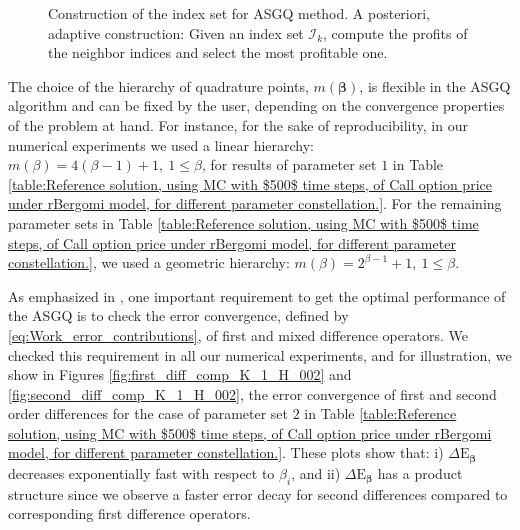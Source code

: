 \begin{figure}[htb]
\begin{subfigure}{0.165\textwidth}
 		\caption{}
 		\label{fig:6}
 	\end{subfigure}
 	\caption{Construction of the index set for ASGQ method. A posteriori, adaptive construction: Given an index set $\mathcal{I}_k$, compute the profits of the neighbor indices and select the most profitable one.}
 	\label{fig:Construction of the index set for ASGQ method}
 \end{figure}
\FloatBarrier

\begin{remark}
	The choice of the hierarchy of quadrature points, $m(\boldsymbol{\beta})$, is flexible in the ASGQ algorithm and can be fixed by the user, depending on the convergence properties of the problem at hand. For instance, for the sake of reproducibility, in our numerical experiments we used a linear hierarchy: $m(\beta)=4 (\beta-1)+1,\: 1 \le \beta $, for results of parameter set $1$ in Table \ref{table:Reference solution, using MC with $500$ time steps, of Call option price under rBergomi model, for different parameter constellation.}. For the remaining parameter sets in Table  \ref{table:Reference solution, using MC with $500$ time steps, of Call option price under rBergomi model, for different parameter constellation.}, we used a geometric hierarchy: $m(\beta)=2^{\beta-1}+1, \:1 \le \beta $.
\end{remark} 
\begin{remark}
As emphasized in \cite{haji2016multi}, one important requirement to get the optimal performance of the ASGQ is to check  the error convergence, defined by \eqref{eq:Work_error_contributions},  of first and mixed difference operators. We checked this requirement in all our numerical experiments, and for illustration, we show in Figures  \ref{fig:first_diff_comp_K_1_H_002} and \ref{fig:second_diff_comp_K_1_H_002}, the error convergence of first and second order differences for the case of parameter set $2$ in Table \ref{table:Reference solution, using MC with $500$ time steps, of Call option price under rBergomi model, for different parameter constellation.}.  These plots show that: i) $\Delta \text{E}_{\boldsymbol{\beta}}$ decreases exponentially fast with respect to $\beta_i$, and ii) $\Delta \text{E}_{\boldsymbol{\beta}}$ has a  product structure since  we  observe  a faster error decay for second differences compared to corresponding first difference operators.
\end{remark} 

